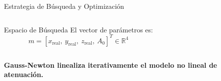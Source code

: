 \begin{frame}{Estrategia de Búsqueda y Optimización}
\begin{columns}[T]
        \vspace{0.2cm}

        \begin{block}{Espacio de Búsqueda}
            \centering
            \scriptsize
            El vector de parámetros es:
            \[
                m = [x_{\text{real}},\ y_{\text{real}},\ z_{\text{real}},\ A_0]^T \in \mathbb{R}^4
            \]
        \end{block}

    \end{columns}

    \vspace{0.1cm}
    \begin{center}
        \footnotesize
        \textbf{Gauss-Newton linealiza iterativamente el modelo no lineal de atenuación.}
    \end{center}

\end{frame}
